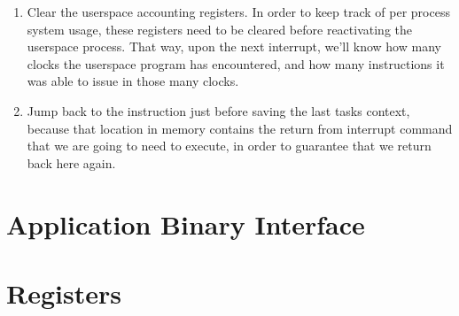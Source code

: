 \documentclass{gqtekspec}
\begin{document}
\begin{enumerate}
\item Clear the userspace accounting registers.  In order to keep track of
	per process system usage, these registers need to be cleared before
	reactivating the userspace process.  That way, upon the next
	interrupt, we'll know how many clocks the userspace program has
	encountered, and how many instructions it was able to issue in
	those many clocks. 

\item Jump back to the instruction just before saving the last tasks context,
	because that location in memory contains the return from interrupt
	command that we are going to need to execute, in order to guarantee
	that we return back here again.
\end{enumerate}

\chapter{Application Binary Interface}\label{chap:abi}
%
%
%
\chapter{Registers}\label{chap:regs}
\end{document}

